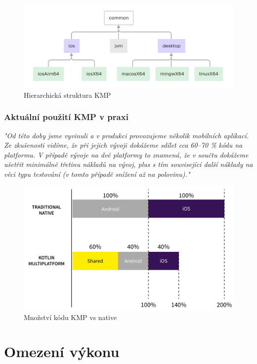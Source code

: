 \begin{figure}[H]
  \centering
  \includegraphics[width=1\textwidth]{kotlin-multiplatform-hierarchical-structure.png}
  \caption{Hierarchická struktura KMP}
  \label{fig:KMP_struktura}
\end{figure}

\subsubsection{Aktuální použití KMP v praxi}


\emph{"Od této doby jsme vyvinuli a v produkci provozujeme několik mobilních aplikací. Ze zkušenosti vidíme, že při jejich vývoji dokážeme sdílet cca 60–70 \% kódu na platformu. V případě vývoje na dvě platformy to znamená, že v součtu dokážeme ušetřit minimálně třetinu nákladů na vývoj, plus s tím související další náklady na věci typu testování (v tomto případě snížení až na polovinu)."}

\begin{figure}[H]
  \centering
  \includegraphics[width=.7\textwidth]{chart-KMP-vs-native.png}
  \caption{Množství kódu KMP vs native}
  \label{fig:KMP_vs_native}
\end{figure}

\section{Omezení výkonu}


